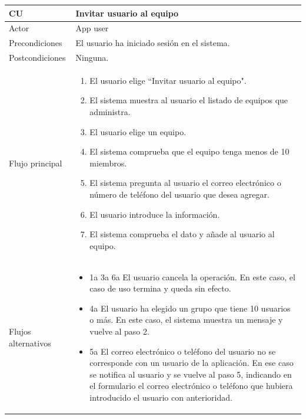 \documentclass[twoside]{report}
\newcommand\addrow[2]{#1 &#2\\ }
\newcommand\addheading[2]{#1 &#2\\ \hline}
\newcommand\tabularhead{\begin{tabular}{lp{0.7\textwidth}}
\hline
}
\newenvironment{usecase}{\tabularhead}
{\hline\end{tabular}}
\begin{document}
\begin{usecase}
  \addheading{\textbf{CU\arabic{usecase}}}{Invitar usuario al equipo} 
  \addrow{Actor}{App user}
  \addrow{Precondiciones}{El usuario ha iniciado sesión en el sistema.}
  \addrow{Postcondiciones}{Ninguna.}
  \addrow{Flujo principal}{
  		\begin{enumerate}
  		\item El usuario elige “Invitar usuario al equipo". %
  		\item El sistema muestra al usuario el listado de equipos que administra. %
  		\item El usuario elige un equipo. %
  		\item El sistema comprueba que el equipo tenga menos de 10 miembros. %
  		\item El sistema pregunta al usuario el correo electrónico o número de teléfono del usuario que desea agregar. %
  		\item El usuario introduce la información. %
  		\item El sistema comprueba el dato y añade al usuario al equipo. %
  		\end{enumerate}
  }
  \addrow{Flujos alternativos}{
  		\begin{itemize}
  		\item 1a 3a 6a El usuario cancela la operación. En este caso, el caso de uso termina y queda sin efecto.
  		\item 4a El usuario ha elegido un grupo que tiene 10 usuarios o más. En este caso, el sistema muestra un mensaje y vuelve al paso 2.
  		\item 5a El correo electrónico o teléfono del usuario no se corresponde con un usuario de la aplicación. En ese caso se notifica al usuario y se vuelve al paso 5, indicando en el formulario el correo electrónico o teléfono que hubiera introducido el usuario con anterioridad.
  		\end{itemize}
  }
\end{usecase}\\
\end{document}
